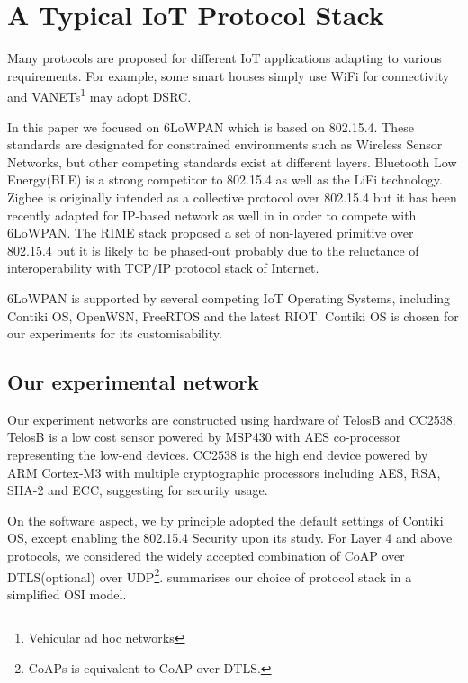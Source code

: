 \section{A Typical IoT Protocol Stack}
Many protocols are proposed for different IoT applications adapting to various requirements. For example, some smart houses simply use WiFi for connectivity and VANETs\footnote{Vehicular ad hoc networks} may adopt DSRC\cite{DSRC}. 

In this paper we focused on 6LoWPAN\cite{rfc4944} which is based on 802.15.4\cite{802154}. These standards are designated for constrained environments such as Wireless Sensor Networks,  but other competing standards exist at different layers. Bluetooth Low Energy(BLE)\cite{BLE} is a strong competitor to 802.15.4 as well as the LiFi\cite{LiFi} technology. Zigbee\cite{Zigbee} is originally intended as a collective protocol over 802.15.4 but it has been recently adapted for IP-based network as well in \cite{ZigbeeIp} in order to compete with 6LoWPAN. The RIME stack\cite{RIME} proposed a set of non-layered primitive over 802.15.4 but it is likely to be phased-out probably due to the reluctance of interoperability with TCP/IP protocol stack of Internet. 

6LoWPAN is supported by several competing IoT Operating Systems, including Contiki OS\cite{Contiki}, OpenWSN\cite{OpenWSN}, FreeRTOS\cite{FreeRTOS} and the latest RIOT\cite{RIOT}. Contiki OS is chosen for our experiments for its customisability.

\subsection{Our experimental network}
Our experiment networks are constructed using hardware of TelosB\cite{TelosB} and CC2538\cite{CC2538}. TelosB is a low cost sensor powered by MSP430 with AES co-processor representing the low-end devices. CC2538 is the high end device powered by ARM Cortex-M3 with multiple cryptographic processors including AES, RSA, SHA-2 and ECC, suggesting for security usage.

On the software aspect, we by principle adopted the default settings of Contiki OS, except enabling the 802.15.4 Security upon its study. For Layer 4\cite{OSI} and above protocols, we considered the widely accepted combination of CoAP over DTLS(optional) over UDP\footnote{CoAPs is equivalent to CoAP over DTLS.}.  summarises our choice of protocol stack in a simplified OSI\cite{OSI} model.

